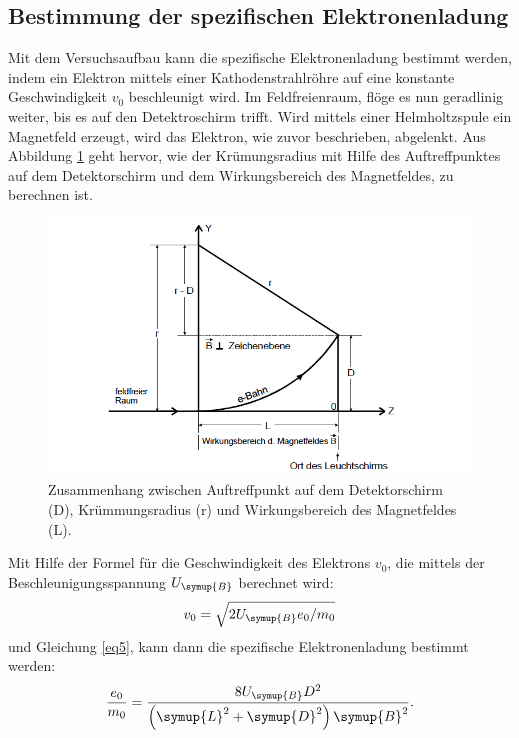 \subsection{Bestimmung der spezifischen Elektronenladung}
Mit dem Versuchsaufbau kann die spezifische Elektronenladung bestimmt werden, indem ein
Elektron mittels einer Kathodenstrahlröhre auf eine konstante Geschwindigkeit $v_0$ beschleunigt wird.
Im Feldfreienraum, flöge es nun geradlinig weiter, bis es auf den Detektroschirm trifft.
Wird mittels einer Helmholtzspule ein Magnetfeld erzeugt, wird das Elektron, wie zuvor beschrieben, abgelenkt.
Aus Abbildung \ref{abb3} geht hervor, wie der Krümungsradius mit Hilfe des Auftreffpunktes auf dem Detektorschirm
und dem Wirkungsbereich des Magnetfeldes, zu berechnen ist.
\FloatBarrier
\begin{figure}
  \centering
  \includegraphics[scale=0.5]{abl2.PNG}
  \caption{Zusammenhang zwischen Auftreffpunkt auf dem Detektorschirm (D),
  Krümmungsradius (r) und Wirkungsbereich des Magnetfeldes (L). \cite{Q1}}
  \label{abb3}
\end{figure}
\FloatBarrier
Mit Hilfe der Formel für die Geschwindigkeit des Elektrons $v_0$, die mittels der Beschleunigungsspannung $U_\symup{B}$
berechnet wird:
\FloatBarrier
\begin{align*}\label{eq6}
  v_0 = \sqrt{2 U_\symup{B} e_0/m_0}
\end{align*}
\FloatBarrier
und Gleichung \ref{eq5}, kann dann die spezifische Elektronenladung bestimmt werden:
\FloatBarrier
\begin{align*}
  \frac{e_0}{m_0} = \frac{8 U_\symup{B} D^2}{\left(\symup{L}^2 + \symup{D}^2\right)\symup{B}^2}.
\end{align*}

